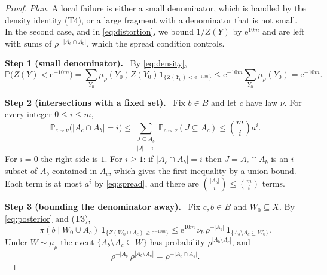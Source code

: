 \documentclass[11pt]{article}
\numberwithin{equation}{section}
\theoremstyle{remark}
\newcommand{\PP}{\mathbb P}
\newcommand{\ind}{\mathbf 1}
\newcommand{\ee}{\mathrm e}
\newcommand{\step}[1]{\par\medskip\noindent\textbf{#1}\ }
\begin{document}
\begin{proof}
\emph{Plan.} A local failure is either a small denominator, which is
handled by the density identity (T4), or a large fragment with a
denominator that is not small. In the second case, and in
\eqref{eq:distortion}, we bound $1/Z(Y)$ by $\ee^{10m}$ and are left
with sums of $\rho^{-|A_c\cap A_b|}$, which the spread condition
controls.

\step{Step 1 (small denominator).} By \eqref{eq:density},
\begin{equation}\label{eq:small-denominator}
 \PP\bigl(Z(Y)<\ee^{-10m}\bigr)
 =\sum_{Y_0}\mu_\rho(Y_0)Z(Y_0)\ind_{\{Z(Y_0)<\ee^{-10m}\}}
 \le\ee^{-10m}\sum_{Y_0}\mu_\rho(Y_0)=\ee^{-10m}.
\end{equation}

\step{Step 2 (intersections with a fixed set).} Fix $b\in B$ and let $c$
have law $\nu$. For every integer $0\le i\le m$,
\begin{equation}\label{eq:intersection}
 \PP_{c\sim\nu}\bigl(|A_c\cap A_b|=i\bigr)
 \le\sum_{\substack{J\subseteq A_b\\|J|=i}}
        \PP_{c\sim\nu}(J\subseteq A_c)
 \le\binom mi a^i.
\end{equation}
For $i=0$ the right side is $1$. For $i\ge1$: if $|A_c\cap A_b|=i$ then
$J=A_c\cap A_b$ is an $i$-subset of $A_b$ contained in $A_c$, which
gives the first inequality by a union bound. Each term is at most $a^i$
by \eqref{eq:spread}, and there are
$\binom{|A_b|}{i}\le\binom mi$ terms.

\step{Step 3 (bounding the denominator away).} Fix $c,b\in B$ and
$W_0\subseteq X$. By \eqref{eq:posterior} and (T3),
\begin{equation}\label{eq:basic}
 \pi(b\mid W_0\cup A_c)\,\ind_{\{Z(W_0\cup A_c)\ge\ee^{-10m}\}}
 \le\ee^{10m}\,\nu_b\,\rho^{-|A_b|}\,
    \ind_{\{A_b\setminus A_c\subseteq W_0\}}.
\end{equation}
Under $W\sim\mu_\rho$ the event $\{A_b\setminus A_c\subseteq W\}$ has
probability $\rho^{|A_b\setminus A_c|}$, and
\begin{equation}\label{eq:rho-cancel}
 \rho^{-|A_b|}\rho^{|A_b\setminus A_c|}=\rho^{-|A_c\cap A_b|}.
\end{equation}


\end{proof}
\end{document}
